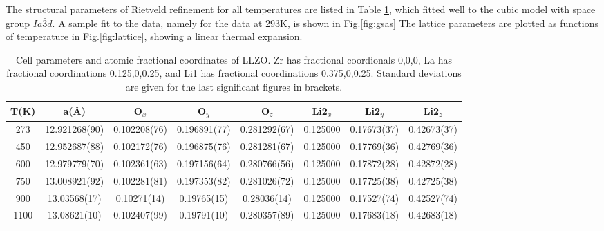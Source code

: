 \documentclass[twoside,twocolumn,9pt]{article}
\begin{document}
The structural parameters of Rietveld refinement for all temperatures are listed in Table \ref{tab:cell_parameters},
which fitted well to the cubic model with space group $Ia\bar{3}d$. A sample fit to the data, namely for the data at 293K, is shown in Fig.\ref{fig:gsas}
The lattice parameters are plotted as functions of temperature in Fig.\ref{fig:lattice}, showing a linear thermal expansion.


\begin{table}[h]
\centering
\caption{Cell parameters and atomic fractional coordinates of LLZO. Zr has fractional coordionals 0,0,0, La has fractional coordinations 0.125,0,0.25, and Li1 has fractional coordinations 0.375,0,0.25.
Standard deviations are given for the last significant figures in brackets. } 
\label{tab:cell_parameters}
\begin{tabular}{cccccccc}
\hline
\hline
T(K)  & a(\AA)       & O$_{x}$        & O$_{y}$        & O$_{z}$       & Li2$_{x}$      & Li2$_{y}$           & Li2$_{z}$      \\
\hline
273  & 12.921268(90) & 0.102208(76)   & 0.196891(77)   & 0.281292(67)   & 0.125000       & 0.17673(37)         & 0.42673(37)   \\
450  & 12.952687(88) & 0.102172(76)   & 0.196875(76)   & 0.281281(67)   & 0.125000       & 0.17769(36)         & 0.42769(36)   \\
600  & 12.979779(70) & 0.102361(63)   & 0.197156(64)   & 0.280766(56)   & 0.125000       & 0.17872(28)         & 0.42872(28)   \\
750  & 13.008921(92) & 0.102281(81)   & 0.197353(82)   & 0.281026(72)   & 0.125000       & 0.17725(38)         & 0.42725(38)   \\
900  & 13.03568(17)  & 0.10271(14)    & 0.19765(15)    & 0.28036(14)    & 0.125000       & 0.17527(74)         & 0.42527(74)   \\
1100 & 13.08621(10)  & 0.102407(99)   & 0.19791(10)    & 0.280357(89)   & 0.125000       & 0.17683(18)         & 0.42683(18)   \\
\hline
\hline
\end{tabular}
\end{table}
\end{document}

